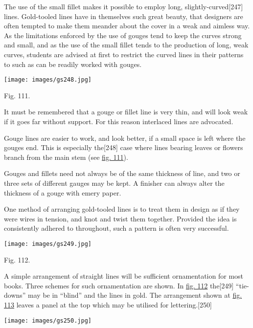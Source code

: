 \documentclass[
]{article}
\begin{document}
The use of the small fillet makes it possible to employ long,
slightly-curved{\protect\hypertarget{Page_247}{}{{[}247{]}}} lines.
Gold-tooled lines have in themselves such great beauty, that designers
are often tempted to make them meander about the cover in a weak and
aimless way. As the limitations enforced by the use of gouges tend to
keep the curves strong and small, and as the use of the small fillet
tends to the production of long, weak curves, students are advised at
first to restrict the curved lines in their patterns to such as can be
readily worked with gouges.

\protect\hypertarget{Fig_111}{}{}
\texttt{[image: images/gs248.jpg]}

Fig. 111.

It must be remembered that a gouge or fillet line is very thin, and will
look weak if it goes far without support. For this reason interlaced
lines are advocated.

Gouge lines are easier to work, and look better, if a small space is
left where the gouges end. This is especially
the{\protect\hypertarget{Page_248}{}{{[}248{]}}} case where lines
bearing leaves or flowers branch from the main stem (see
\protect\hyperlink{Fig_111}{fig. 111}).

Gouges and fillets need not always be of the same thickness of line, and
two or three sets of different gauges may be kept. A finisher can always
alter the thickness of a gouge with emery paper.

One method of arranging gold-tooled lines is to treat them in design as
if they were wires in tension, and knot and twist them together.
Provided the idea is consistently adhered to throughout, such a pattern
is often very successful.

\protect\hypertarget{Fig_112}{}{}
\texttt{[image: images/gs249.jpg]}

Fig. 112.

A simple arrangement of straight lines will be sufficient ornamentation
for most books. Three schemes for such ornamentation are shown. In
\protect\hyperlink{Fig_112}{fig. 112}
the{\protect\hypertarget{Page_249}{}{{[}249{]}}} ``tie-downs'' may be in
``blind'' and the lines in gold. The arrangement shown at
\protect\hyperlink{Fig_113}{fig. 113} leaves a panel at the top which
may be utilised for
lettering.{\protect\hypertarget{Page_250}{}{{[}250{]}}}

\protect\hypertarget{Fig_113}{}{}
\texttt{[image: images/gs250.jpg]}
\end{document}
